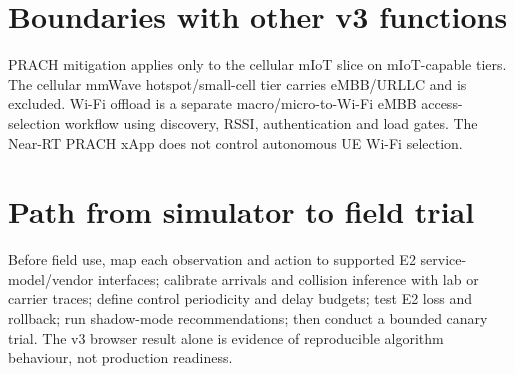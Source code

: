 \documentclass[10pt]{article}
\begin{document}
\section{Boundaries with other v3 functions}
PRACH mitigation applies only to the cellular mIoT slice on mIoT-capable tiers. The cellular mmWave hotspot/small-cell tier carries eMBB/URLLC and is excluded. Wi-Fi offload is a separate macro/micro-to-Wi-Fi eMBB access-selection workflow using discovery, RSSI, authentication and load gates. The Near-RT PRACH xApp does not control autonomous UE Wi-Fi selection.

\section{Path from simulator to field trial}
Before field use, map each observation and action to supported E2 service-model/vendor interfaces; calibrate arrivals and collision inference with lab or carrier traces; define control periodicity and delay budgets; test E2 loss and rollback; run shadow-mode recommendations; then conduct a bounded canary trial. The v3 browser result alone is evidence of reproducible algorithm behaviour, not production readiness.
\end{document}
